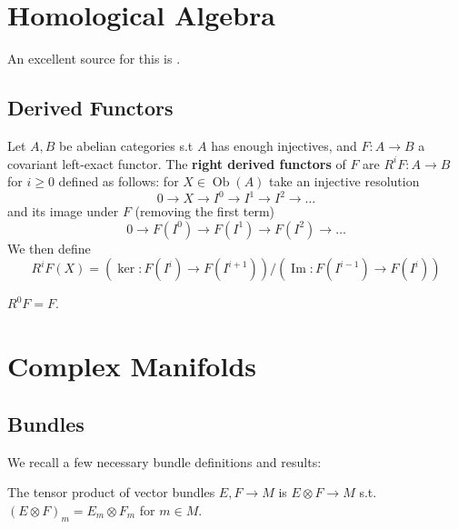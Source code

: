 \documentclass{article}
\begin{document}
\section{Homological Algebra}\label{sec: homological algebra}
An excellent source for this is \cite{Weibel1995}. 

\subsection{Derived Functors}

\begin{definition}
	Let $A,B$ be abelian categories s.t $A$ has enough injectives, and $F :A \to B$ a covariant left-exact functor. The \textbf{right derived functors} of $F$ are $R^iF:A \to B$ for $i \geq 0$ defined as follows: for $X \in \operatorname{Ob}(A)$ take an injective resolution
	\[
	0 \to X \to I^0 \to I^1 \to I^2 \to \dots
	\]
	and its image under $F$ (removing the first term)
	\[
	0 \to F(I^0) \to F(I^1) \to F(I^2) \to \dots 
	\]
We then define 
\[
R^iF(X) = (\ker :F(I^i) \to F(I^{i+1}))/(\operatorname{Im}:F(I^{i-1}) \to F(I^i))
\]
\end{definition}

\begin{lemma}
	$R^0F = F$. 
\end{lemma}



\section{Complex Manifolds}
\subsection{Bundles}
We recall a few necessary bundle definitions and results:
\begin{definition}
	The tensor product of vector bundles $E,F \to M$ is $E\otimes F \to M$ s.t. $(E \otimes F)_m = E_m \otimes F_m$ for $m \in M$. 
\end{definition}
\end{document}
